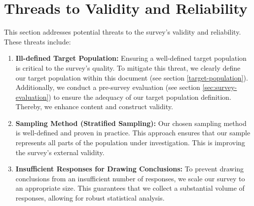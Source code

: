 \documentclass[%
class=scrreprt,
chapterprefix=false,%
open=right,%
twoside=false,%
paper=a4,%
logofile={Logo\_zentral\_farbig\_EN.png},%
thesistype=masterproposal,%
UKenglish,%
]{se2thesis}
\begin{document}
\section{Threads to Validity and Reliability} %
This section addresses potential threats to the survey's validity and reliability. These threats include:
\begin{enumerate}
	\item \textbf{Ill-defined Target Population:} Ensuring a well-defined target population is critical to the survey's quality. To mitigate this threat, we clearly define our target population within this document (see section \ref{target-population}). Additionally, we conduct a pre-survey evaluation (see section \ref{sec:survey-evaluation}) to ensure the adequacy of our target population definition. Thereby, we enhance content and construct validity.
	
	\item \textbf{Sampling Method (Stratified Sampling):} Our chosen sampling method is well-defined and proven in practice. This approach ensures that our sample represents all parts of the population under investigation. This is improving the survey's external validity.
	
	\item \textbf{Insufficient Responses for Drawing Conclusions:} To prevent drawing conclusions from an insufficient number of responses, we scale our survey to an appropriate size. This guarantees that we collect a substantial volume of responses, allowing for robust statistical analysis.
\end{enumerate}
\end{document}
